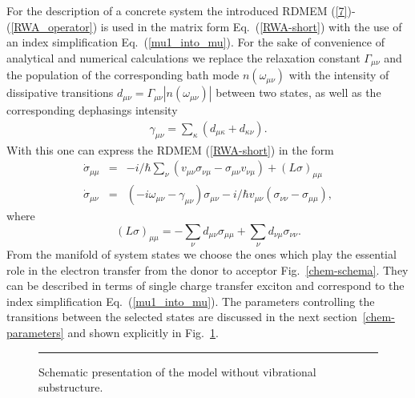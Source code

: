 \documentclass[12pt,twoside,a4paper]{report}
\begin{document}
For the description of a concrete system the introduced 
RDMEM (\ref{7})-(\ref{RWA_operator})
is used in the matrix form Eq.~(\ref{RWA-short}) with the use of
an index simplification Eq.~(\ref{mu1_into_mu}).
For the sake of convenience of analytical and numerical calculations we replace
the relaxation constant  $\Gamma_{\mu{}\nu}$ and 
the population 
 of the corresponding bath mode
$n(\omega_{\mu{} \nu})$ with the intensity of dissipative
transitions $d_{\mu \nu}=\Gamma_{\mu \nu}|n(\omega_{\mu \nu})|$ 
between two states, as well as the corresponding
dephasings intensity 
\begin{eqnarray}
\label{dephasing}
\gamma
_{\mu \nu }
             =  
                    \sum_\kappa 
                        \left(
                             d_{\mu \kappa }
                           + d_{ \kappa  \nu }
                        \right). 
\end{eqnarray}
With this
one can express the RDMEM
(\ref{RWA-short}) in the form
\begin{eqnarray} 
\label{tosolve1}
\dot \sigma_{\mu\mu} 
                &=&   -i/\hbar \sum_ \nu  
                                (v_{\mu \nu }\sigma_{ \nu \mu}-\sigma_{\mu \nu }v_{ \nu \mu})
                              + (L\sigma)_{\mu\mu}                        \\ 
\label{tosolve2}
\dot \sigma_{\mu \nu } 
                &=&  (-i\omega_{\mu \nu }-\gamma_{\mu \nu })\sigma_{\mu \nu }
                     -i/\hbar v_{\mu \nu }(\sigma_{ \nu  \nu }-\sigma_{\mu\mu}), 
\end{eqnarray} 
where 
\begin{equation}
\label{relax-matrix-diag}
(L\sigma)_{\mu\mu}
         =   -  \sum_ \nu  
                       d_{\mu \nu }\sigma_{\mu\mu}
             +  \sum_ \nu  
                       d_{ \nu \mu}\sigma_{ \nu  \nu }.
\end{equation}
From the manifold of system states we choose
the ones which play the essential role in the electron
transfer from the donor to acceptor Fig.~\ref{chem-schema}.  
They can be described in terms of single charge transfer exciton and
correspond to the index simplification Eq.~(\ref{mu1_into_mu}). The
parameters controlling the transitions between the selected states are
discussed in the next 
section~\ref{chem-parameters} and shown explicitly 
in Fig.~\ref{TB-schema}.
\begin{footnotesize}\begin{figure}[!h]
  \begin{center}
\parbox{4.0cm}{\rule{-3cm}{.1cm}\epsfxsize=8.0cm}
    \leavevmode
    \caption[Schematic presentation of the model without vibrational substructure]
{\small Schematic presentation of the model without vibrational substructure.}
    \label{TB-schema}
  \end{center}
\end{figure}\end{footnotesize}
\end{document}
